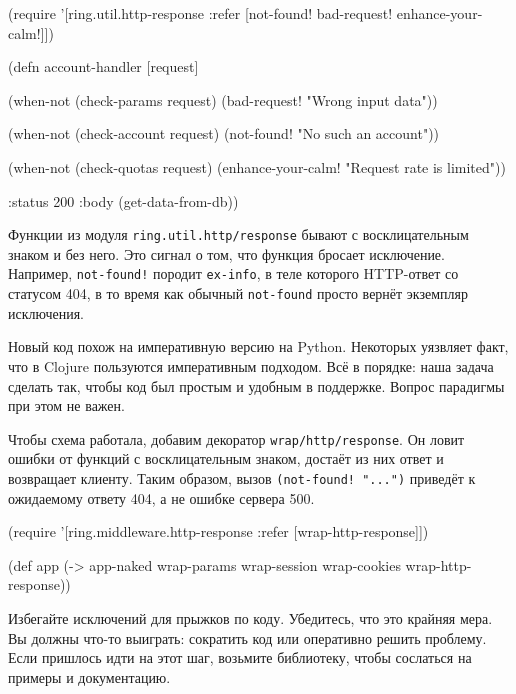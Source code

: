 \begin{english}
  \begin{clojure}
(require '[ring.util.http-response
           :refer [not-found!
                   bad-request!
                   enhance-your-calm!]])

(defn account-handler [request]

  (when-not (check-params request)
    (bad-request! "Wrong input data"))

  (when-not (check-account request)
    (not-found! "No such an account"))

  (when-not (check-quotas request)
    (enhance-your-calm! "Request rate is limited"))

  {:status 200
   :body (get-data-from-db)})
  \end{clojure}
\end{english}

\fi

\fi

\fi

Функции из модуля \texttt{ring.util.http\-/response} бывают с восклицательным
знаком и без него. Это сигнал о том, что функция бросает исключение. Например,
\verb|not-found!| породит \verb|ex-info|, в теле которого HTTP-ответ со статусом
404, в то время как обычный \verb|not-found| просто вернёт экземпляр исключения.

Новый код похож на императивную версию на Python. Некоторых уязвляет факт, что в
Clojure пользуются императивным подходом. Всё в порядке: наша задача сделать
так, чтобы код был простым и удобным в поддержке. Вопрос парадигмы при этом не
важен.


Чтобы схема работала, добавим декоратор \texttt{wrap\-/http\-/response}. Он ловит
ошибки от функций с восклицательным знаком, достаёт из них ответ и возвращает
клиенту. Таким образом, вызов \verb|(not-found! "...")| приведёт к ожидаемому
ответу 404, а не ошибке сервера 500.

\begin{english}
  \begin{clojure}
(require '[ring.middleware.http-response
           :refer [wrap-http-response]])

(def app
  (-> app-naked
      wrap-params
      wrap-session
      wrap-cookies
      wrap-http-response))
  \end{clojure}
\end{english}

Избегайте исключений для прыжков по коду. Убедитесь, что это крайняя мера. Вы
должны что-то выиграть: сократить код или оперативно решить проблему. Если
пришлось идти на этот шаг, возьмите библиотеку, чтобы сослаться на примеры и
документацию.

